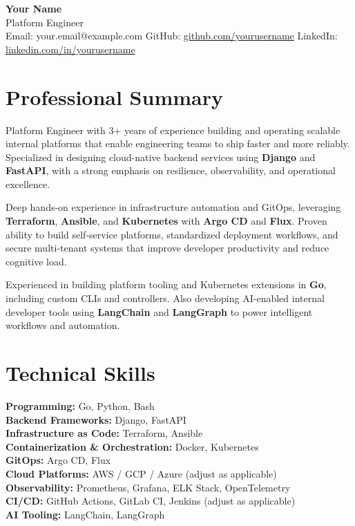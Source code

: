 \documentclass[11pt,a4paper]{article}
\begin{document}
\begin{center}
    {\LARGE \textbf{Your Name}} \\
    \vspace{4pt}
    Platform Engineer \\
    \vspace{4pt}
    Email: your.email@example.com \quad
    GitHub: \href{https://github.com/yourusername}{github.com/yourusername} \quad
    LinkedIn: \href{https://linkedin.com/in/yourusername}{linkedin.com/in/yourusername}
\end{center}

\vspace{8pt}

\section*{Professional Summary}

Platform Engineer with 3+ years of experience building and operating scalable internal platforms that enable engineering teams to ship faster and more reliably. Specialized in designing cloud-native backend services using \textbf{Django} and \textbf{FastAPI}, with a strong emphasis on resilience, observability, and operational excellence.

Deep hands-on experience in infrastructure automation and GitOps, leveraging \textbf{Terraform}, \textbf{Ansible}, and \textbf{Kubernetes} with \textbf{Argo CD} and \textbf{Flux}. Proven ability to build self-service platforms, standardized deployment workflows, and secure multi-tenant systems that improve developer productivity and reduce cognitive load.

Experienced in building platform tooling and Kubernetes extensions in \textbf{Go}, including custom CLIs and controllers. Also developing AI-enabled internal developer tools using \textbf{LangChain} and \textbf{LangGraph} to power intelligent workflows and automation.

\vspace{6pt}

\section*{Technical Skills}

\textbf{Programming:} Go, Python, Bash \\
\textbf{Backend Frameworks:} Django, FastAPI \\
\textbf{Infrastructure as Code:} Terraform, Ansible \\
\textbf{Containerization \& Orchestration:} Docker, Kubernetes \\
\textbf{GitOps:} Argo CD, Flux \\
\textbf{Cloud Platforms:} AWS / GCP / Azure (adjust as applicable) \\
\textbf{Observability:} Prometheus, Grafana, ELK Stack, OpenTelemetry \\
\textbf{CI/CD:} GitHub Actions, GitLab CI, Jenkins (adjust as applicable) \\
\textbf{AI Tooling:} LangChain, LangGraph
\end{document}
